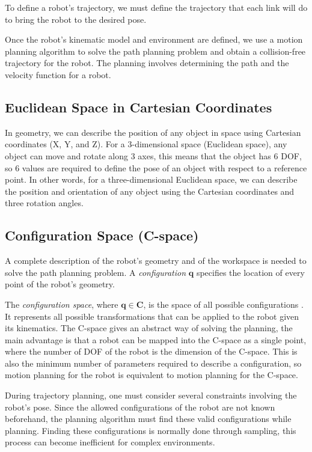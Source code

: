 To define a robot's trajectory, we must define the trajectory that each link will do to bring the robot to the desired pose.

Once the robot's kinematic model and environment are defined, we use a motion planning algorithm to solve the path planning problem and obtain a collision-free trajectory for the robot. The planning involves determining the path and the velocity function for a robot. 

\subsection{Euclidean Space in Cartesian Coordinates}

In geometry, we can describe the position of any object in space using Cartesian coordinates (X, Y, and Z). For a 3-dimensional space (Euclidean space), any object can move and rotate along 3 axes, this means that the object has 6 DOF, so 6 values are required to define the pose of an object with respect to a reference point. In other words, for a three-dimensional Euclidean space, we can describe the position and orientation of any object using the Cartesian coordinates and three rotation angles.

\subsection{Configuration Space (C-space)}
\label{subsec:cspace}

A complete description of the robot's geometry and of the workspace is needed to solve the path planning problem. A \textit{configuration} $\bm{q}$ specifies the location of every point of the robot's geometry. 

The \textit{configuration space}, where \( \bm{q} \in  \bm{C} \), is the space of all possible configurations \citep{Handbook}. It represents all possible transformations that can be applied to the robot given its kinematics. The C-space gives an abstract way of solving the planning, the main advantage is that a robot can be mapped into the C-space as a single point, where the number of DOF of the robot is the dimension of the C-space. This is also the minimum number of parameters required to describe a configuration, so motion planning for the robot is equivalent to motion planning for the C-space.

During trajectory planning, one must consider several constraints involving the robot's pose. Since the allowed configurations of the robot are not known beforehand, the planning algorithm must find these valid configurations while planning. Finding these configurations is normally done through sampling, this process can become inefficient for complex environments.

